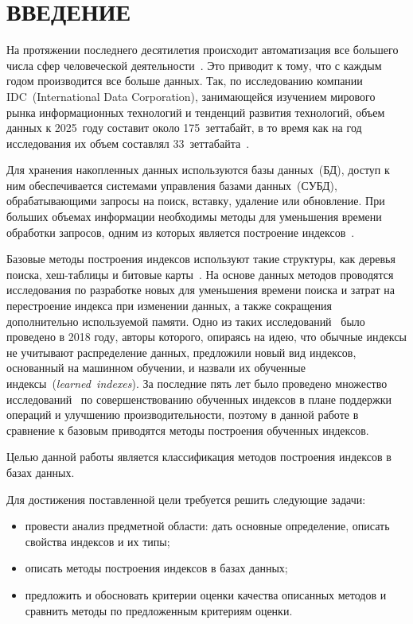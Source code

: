 \chapter*{ВВЕДЕНИЕ}

На протяжении последнего десятилетия происходит автоматизация все большего числа
сфер человеческой деятельности~\cite{koptenok}. Это приводит к тому, что с
каждым годом производится все больше данных. Так, по исследованию компании
IDC~(International Data Corporation), занимающейся изучением мирового рынка
информационных технологий и тенденций развития технологий, объем данных к
2025~году составит около 175~зеттабайт, в то время как на год исследования их
объем составлял 33~зеттабайта~\cite{idc}.

Для хранения накопленных данных используются базы данных~(БД), доступ к ним
обеспечивается системами управления базами данных~(СУБД), обрабатывающими
запросы на поиск, вставку, удаление или обновление. При больших объемах
информации необходимы методы для уменьшения времени обработки запросов, одним из
которых является построение индексов~\cite{bits}.

Базовые методы построения индексов используют такие структуры, как деревья
поиска, хеш-таблицы и битовые карты~\cite{dama}. На основе данных методов
проводятся исследования по разработке новых для уменьшения времени поиска и
затрат на перестроение индекса при изменении данных, а также сокращения
дополнительно используемой памяти. Одно из таких исследований~\cite{main} было
проведено в 2018 году, авторы которого, опираясь на идею, что обычные индексы не
учитывают распределение данных, предложили новый вид индексов, основанный на
машинном обучении, и назвали их обученные индексы~(\textit{learned~indexes}). За
последние пять лет было проведено множество исследований~\cite{alex, apex,
ulipp, pgmi} по совершенствованию обученных индексов в плане поддержки операций
и улучшению производительности, поэтому в данной работе в сравнение к базовым
приводятся методы построения обученных индексов.


Целью данной работы является классификация методов построения индексов в
базах данных.

Для достижения поставленной цели требуется решить следующие задачи:
\begin{itemize}
    \item провести анализ предметной области: дать основные определение, описать
        свойства индексов и их типы;
    \item описать методы построения индексов в базах данных;
    \item предложить и обосновать критерии оценки качества описанных методов
      и сравнить методы по предложенным критериям оценки.
\end{itemize}
